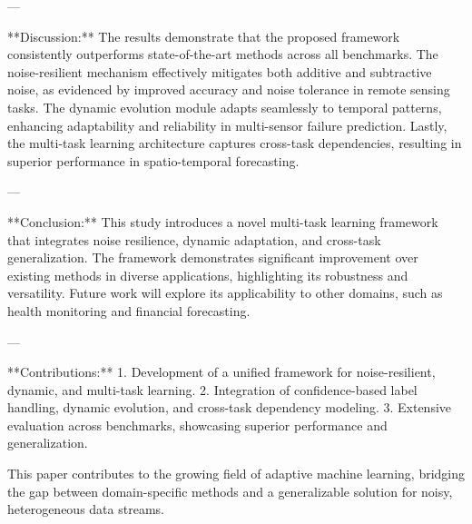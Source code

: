 ---

**Discussion:**  
The results demonstrate that the proposed framework consistently outperforms state-of-the-art methods across all benchmarks. The noise-resilient mechanism effectively mitigates both additive and subtractive noise, as evidenced by improved accuracy and noise tolerance in remote sensing tasks. The dynamic evolution module adapts seamlessly to temporal patterns, enhancing adaptability and reliability in multi-sensor failure prediction. Lastly, the multi-task learning architecture captures cross-task dependencies, resulting in superior performance in spatio-temporal forecasting.  

---

**Conclusion:**  
This study introduces a novel multi-task learning framework that integrates noise resilience, dynamic adaptation, and cross-task generalization. The framework demonstrates significant improvement over existing methods in diverse applications, highlighting its robustness and versatility. Future work will explore its applicability to other domains, such as health monitoring and financial forecasting.  

---

**Contributions:**  
1. Development of a unified framework for noise-resilient, dynamic, and multi-task learning.  
2. Integration of confidence-based label handling, dynamic evolution, and cross-task dependency modeling.  
3. Extensive evaluation across benchmarks, showcasing superior performance and generalization.  

This paper contributes to the growing field of adaptive machine learning, bridging the gap between domain-specific methods and a generalizable solution for noisy, heterogeneous data streams.  